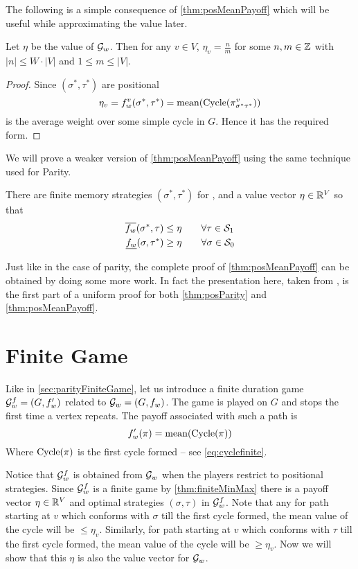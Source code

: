The following is a simple consequence of \autoref{thm:posMeanPayoff} which will be useful while approximating the value later.
\begin{corollary}
    \label{cor:valMeanPayoff}
    Let $\eta$ be the value of $\mathcal{G}_w$. Then for any $v \in V$,
  $\eta_v=\frac{n}{m}$ for some $n,m \in \mathbb{Z}$ with $|n| \leq W \cdot |V|$ and $1 \leq m \leq |V|$.
\end{corollary}
\begin{proof}
     Since $(\sigma^*,\tau^*)$ are positional
    \[
        \eta_v = f^v_w(\sigma^*,\tau^*) = \operatorname*{mean}(\operatorname{Cycle}(\pi^v_{\sigma^*\tau^*}))
    \]
    is the average weight over some simple cycle in $G$. Hence it has the required form.
\end{proof}
We will prove a weaker version of \autoref{thm:posMeanPayoff} using the same technique used for Parity.
\begin{theorem}
    \label{thm:meanEquilibrium}
    There are finite memory strategies $(\sigma^*,\tau^*)$ for ,  and a value vector $\eta \in \mathbb{R}^V$ so that
    \begin{equation*}
        \begin{aligned}
            \overline{f_w}(\sigma^*,\tau) &\leq \eta \qquad \forall \tau \in \mathcal{S}_1\\
            \underline{f_w}(\sigma,\tau^*) &\geq \eta \qquad \forall \sigma \in \mathcal{S}_0
        \end{aligned}
    \end{equation*}
\end{theorem}
Just like in the case of parity, the complete proof of \autoref{thm:posMeanPayoff} can be obtained by doing some more work. In fact the presentation here, taken from \cite{bjorklund_memoryless_2004}, is the first part of a uniform proof for both \autoref{thm:posParity} and \autoref{thm:posMeanPayoff}.

\section{Finite Game}
Like in \autoref{sec:parityFiniteGame}, let us introduce a finite duration game $\mathcal{G}^f_w=(G,f'_w)$ related to $\mathcal{G}_w=(G,f_w)$. The game is played on $G$ and stops the first time a vertex repeats. The payoff associated with such a path is
\[
    f'_w(\pi) = \operatorname*{mean}(\operatorname{Cycle}(\pi))
\]
Where $\operatorname{Cycle}(\pi)$ is the first cycle formed -- see \eqref{eq:cyclefinite}.

Notice that $\mathcal{G}^f_w$ is obtained from $\mathcal{G}_w$ when the players restrict to positional strategies. Since $\mathcal{G}^f_w$  is a finite game by \autoref{thm:finiteMinMax} there is a payoff vector $\eta \in \mathbb{R}^V$ and optimal strategies $(\sigma,\tau)$ in $\mathcal{G}^f_w$. Note that any for path starting at $v$ which conforms with $\sigma$ till the first cycle formed, the mean value of the cycle will be $\leq \eta_v$. Similarly, for path starting at $v$ which conforms with $\tau$ till the first cycle formed, the mean value of the cycle will be $\geq \eta_v$.  Now we will show that this $\eta$ is also the value vector for $\mathcal{G}_w$.

